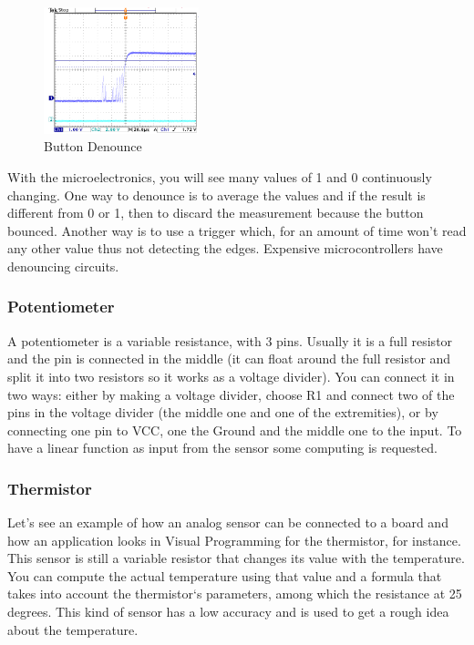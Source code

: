 \begin{figure}[ht]
    \centering
    \includegraphics[width=0.4\textwidth]{figures/Button Denounce.png}
    \caption{Button Denounce}
\end{figure}

With the microelectronics, you will see many values of 1 and 0 continuously changing. One way to denounce is to average the values and if the result is different from 0 or 1, then to discard the measurement because the button bounced. Another way is to use a trigger which, for an amount of time won't read any other value thus not detecting the edges. Expensive microcontrollers have denouncing circuits.  

\subsubsection{Potentiometer}
A potentiometer is a variable resistance, with 3 pins. Usually it is a full resistor and the pin is connected in the middle (it can float around the full resistor and split it into two resistors so it works as a voltage divider). You can connect it in two ways: either by making a voltage divider, choose R1 and connect two of the pins in the voltage divider (the middle one and one of the extremities), or by connecting one pin to VCC, one the Ground and the middle one to the input. To have a linear function as input from the sensor some computing is requested.  

\subsubsection{Thermistor}
Let's see an example of how an analog sensor can be connected to a board and how an application looks in Visual Programming for the thermistor, for instance. This sensor is still a variable resistor that changes its value with the temperature. You can compute the actual temperature using that value and a formula that takes into account the thermistor`s parameters, among which the resistance at 25 degrees. This kind of sensor has a low accuracy and is used to get a rough idea about the temperature. 

